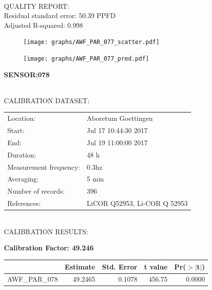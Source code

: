 \documentclass[oneside]{report}
\begin{document}
\hrulefill\\
QUALITY REPORT:\\
Residual standard error: 50.39 PPFD\\
Adjusted R-squared: 0.998



\begin{figure}[H]
  \centering
  \texttt{[image: graphs/AWF\_PAR\_077\_scatter.pdf]}
\end{figure}




\begin{figure}[H]
  \centering
  \texttt{[image: graphs/AWF\_PAR\_077\_pred.pdf]}
\end{figure}

\pagebreak


\begin{center}
\large{\textbf{SENSOR:078}}\\
\end{center}

\hrulefill\\
CALIBRATION DATASET:\\
\begin{table}[h!]
  \centering
  \label{tab:table1}
  \begin{tabular}{ll}
    Location: & Aboretum Goettingen\\ 
    
    
    Start:  & Jul 17 10:44:30 2017 \\
    End:   & Jul 19 11:00:00 2017\\ 
    Duration: & 48 h\\
    Measurement frequency: & 0.3hz\\
    Averaging:  &5 min\\
    Number of records: & 396 \\
    References: & LiCOR Q52953, Li-COR Q 52953 \\
  \end{tabular}
\end{table}

\hrulefill\\
CALIBRATION RESULTS:\\


\begin{center}
\textbf{\large{Calibration Factor: 49.246}}\\
\end{center}
\begin{table}[ht]
\centering
\begin{tabular}{rrrrr}
  \hline
 & Estimate & Std. Error & t value & Pr($>$$|$t$|$) \\ 
  \hline
AWF\_PAR\_078 & 49.2465 & 0.1078 & 456.75 & 0.0000 \\ 
   \hline
\end{tabular}
\end{table}
\end{document}
